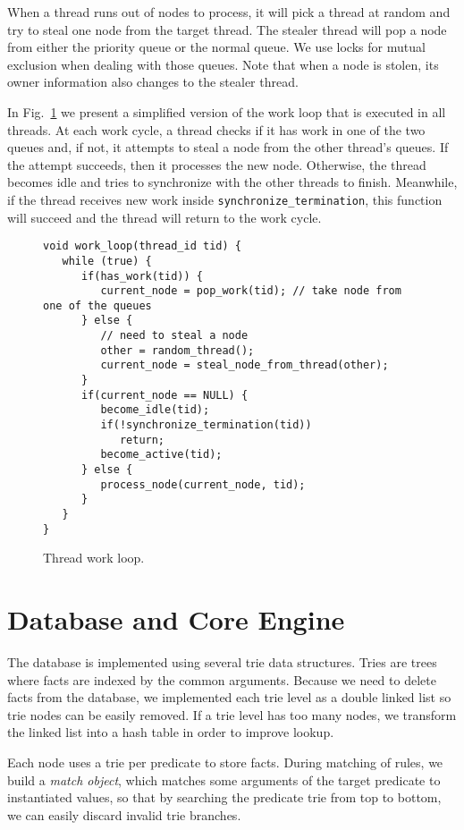 When a thread runs out of nodes to process, it will pick a thread at random and try to steal one node
from the target thread. The stealer thread will pop a node from either the priority queue or the normal queue. We use locks for mutual exclusion when dealing with those queues. Note that when a
node is stolen, its owner information also changes to the stealer thread.

In Fig.~\ref{code:work_loop} we present a simplified version of the work loop that is executed in all threads. At each work cycle,
a thread checks if it has work in one of the two queues and, if not, it attempts to steal a node from the other thread's queues.
If the attempt succeeds, then it processes the new node. Otherwise, the thread becomes idle and tries to
synchronize with the other threads to finish. Meanwhile, if the thread receives new work inside
\texttt{synchronize\_termination}, this function will succeed and the thread will return to the work cycle.

\begin{figure}[h!]
\small\begin{Verbatim}
void work_loop(thread_id tid) {
   while (true) {
      if(has_work(tid)) {
         current_node = pop_work(tid); // take node from one of the queues
      } else {
         // need to steal a node
         other = random_thread();
         current_node = steal_node_from_thread(other);
      }
      if(current_node == NULL) {
         become_idle(tid);
         if(!synchronize_termination(tid))
            return;
         become_active(tid);
      } else {
         process_node(current_node, tid);
      }
   }
}
\end{Verbatim}
  \caption{Thread work loop.}
  \label{code:work_loop}
\end{figure}

\section{Database and Core Engine}\label{sec:core_engine}

The database is implemented using several trie data structures. Tries are trees where facts are indexed
by the common arguments. Because we need to delete facts from the database, we implemented each trie level
as a double linked list so trie nodes can be easily removed. If a trie level has too many nodes, we
transform the linked list into a hash table in order to improve lookup.

Each node uses a trie per predicate to store facts. During matching of rules, we build a
\emph{match object}, which matches some arguments of the target predicate to instantiated values, so
that by searching the predicate trie from top to bottom, we can easily discard invalid trie branches.

